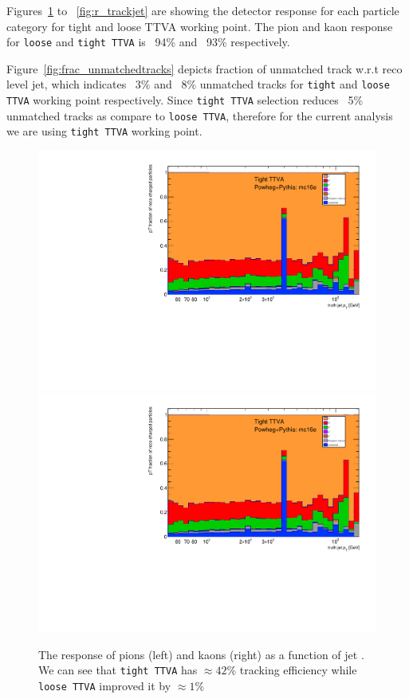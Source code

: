 Figures~\ref{fig:r_pion_kaon} to ~\ref{fig:r_trackjet} are showing the detector response for each particle category for tight and loose TTVA working point. The pion and kaon response for \texttt{loose} and \texttt{tight TTVA} is ~94\% and ~93\% respectively.

Figure~\ref{fig:frac_unmatchedtracks} depicts fraction of unmatched track w.r.t reco level jet, which indicates ~3\% and ~8\% unmatched tracks for \texttt{tight} and \texttt{loose TTVA} working point respectively. Since \texttt{tight TTVA}  selection reduces ~5\% unmatched tracks as compare to \texttt{loose TTVA}, therefore for the current analysis we are using \texttt{tight TTVA} working point.

\begin{figure}[b]
\centering
\includegraphics[scale=0.3, page=4]{figures/jet_comp_study_powheg_Tight_pTFraction_mc16e.pdf}
\includegraphics[scale=0.3, page=5]{figures/jet_comp_study_powheg_Tight_pTFraction_mc16e.pdf}
\caption {The response of pions (left) and  kaons (right) as a function of jet \pT. We can see that \texttt{tight TTVA} has $\approx 42$\% tracking efficiency while \texttt{loose TTVA} improved it by $\approx 1$\%}
\label{fig:r_pion_kaon}
\end{figure}

